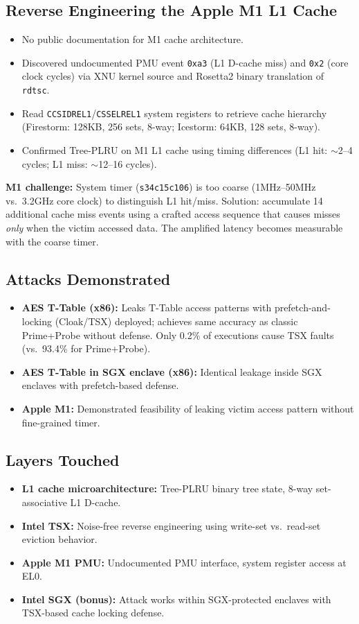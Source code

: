 \documentclass[11pt,letterpaper]{article}
\begin{document}
\subsection*{Reverse Engineering the Apple M1 L1 Cache}
\begin{itemize}
    \item No public documentation for M1 cache architecture.
    \item Discovered undocumented PMU event \texttt{0xa3} (L1 D-cache miss) and \texttt{0x2} (core clock cycles) via XNU kernel source and Rosetta2 binary translation of \texttt{rdtsc}.
    \item Read \texttt{CCSIDREL1}/\texttt{CSSELREL1} system registers to retrieve cache hierarchy (Firestorm: 128KB, 256 sets, 8-way; Icestorm: 64KB, 128 sets, 8-way).
    \item Confirmed Tree-PLRU on M1 L1 cache using timing differences (L1 hit: $\sim$2--4 cycles; L1 miss: $\sim$12--16 cycles).
\end{itemize}

\textbf{M1 challenge:} System timer (\texttt{s34c15c106}) is too coarse (1MHz--50MHz vs.\ 3.2GHz core clock) to distinguish L1 hit/miss.
Solution: accumulate 14 additional cache miss events using a crafted access sequence that causes misses \emph{only} when the victim accessed data. The amplified latency becomes measurable with the coarse timer.

\subsection*{Attacks Demonstrated}
\begin{itemize}
    \item \textbf{AES T-Table (x86):} Leaks T-Table access patterns with prefetch-and-locking (Cloak/TSX) deployed; achieves same accuracy as classic Prime+Probe without defense. Only 0.2\% of executions cause TSX faults (vs.\ 93.4\% for Prime+Probe).
    \item \textbf{AES T-Table in SGX enclave (x86):} Identical leakage inside SGX enclaves with prefetch-based defense.
    \item \textbf{Apple M1:} Demonstrated feasibility of leaking victim access pattern without fine-grained timer.
\end{itemize}

\subsection*{Layers Touched}
\begin{itemize}
    \item \textbf{L1 cache microarchitecture:} Tree-PLRU binary tree state, 8-way set-associative L1 D-cache.
    \item \textbf{Intel TSX:} Noise-free reverse engineering using write-set vs.\ read-set eviction behavior.
    \item \textbf{Apple M1 PMU:} Undocumented PMU interface, system register access at EL0.
    \item \textbf{Intel SGX (bonus):} Attack works within SGX-protected enclaves with TSX-based cache locking defense.
\end{itemize}
\end{document}

